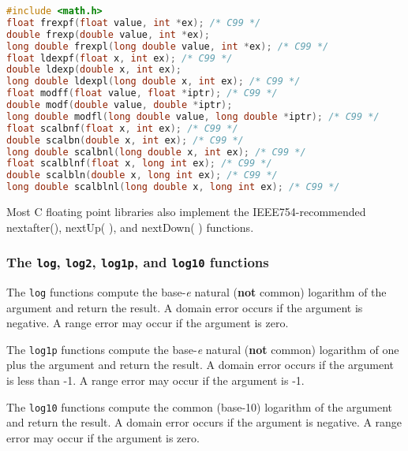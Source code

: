 \lstset{basicstyle=\scriptsize, numbers=left, captionpos=b, tabsize=4}
\begin{lstlisting}[caption=Section \thesection listing \arabic{furthermathcnt},language={C},
breaklines=true,xleftmargin=15pt,label=lst:section\thesection listing\arabic{furthermathcnt}]
#include <math.h>
float frexpf(float value, int *ex); /* C99 */
double frexp(double value, int *ex);
long double frexpl(long double value, int *ex); /* C99 */
float ldexpf(float x, int ex); /* C99 */
double ldexp(double x, int ex);
long double ldexpl(long double x, int ex); /* C99 */
float modff(float value, float *iptr); /* C99 */
double modf(double value, double *iptr); 
long double modfl(long double value, long double *iptr); /* C99 */
float scalbnf(float x, int ex); /* C99 */
double scalbn(double x, int ex); /* C99 */
long double scalbnl(long double x, int ex); /* C99 */
float scalblnf(float x, long int ex); /* C99 */
double scalbln(double x, long int ex); /* C99 */
long double scalblnl(long double x, long int ex); /* C99 */
\end{lstlisting}

Most C floating point libraries also implement the IEEE754-recommended
nextafter(), nextUp( ), and nextDown( ) functions.

\subsubsection{The \texttt{log}, \texttt{log2}, \texttt{log1p}, and
\texttt{log10} functions}
The \texttt{log} functions compute the base-\emph{e} natural (\textbf{not}
common) logarithm of the argument and return the result. A domain error occurs
if the argument is negative. A range error may occur if the argument is zero.

The \texttt{log1p} functions compute the base-\emph{e} natural (\textbf{not}
common) logarithm of one plus the argument and return the result. A domain
error occurs if the argument is less than -1. A range error may occur if the
argument is -1.

The \texttt{log10} functions compute the common (base-10) logarithm of the
argument and return the result. A domain error occurs if the argument is
negative. A range error may occur if the argument is zero.

